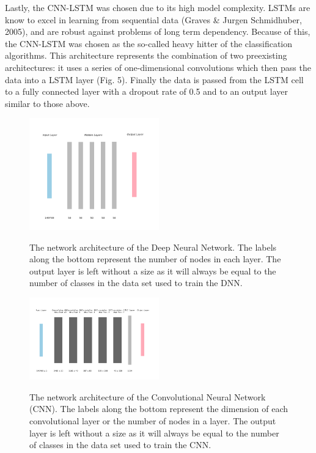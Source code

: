 \documentclass[letterpaper, 10 pt, conference]{ieeeconf}  %
\begin{document}
    Lastly, the CNN-LSTM was chosen due to its high model complexity. LSTMs are know to excel in learning from sequential data (Graves \& Jurgen Schmidhuber, 2005), and are robust against problems of long term dependency. Because of this, the CNN-LSTM was chosen as the so-called heavy hitter of the classification algorithms. This architecture represents the combination of two preexisting architectures: it uses a series of one-dimensional convolutions which then pass the data into a LSTM layer (Fig. 5). Finally the data is passed from the LSTM cell to a fully connected layer with a dropout rate of 0.5 and to an output layer similar to those above. 
 
\begin{figure}
	\centering
    {\label{ref_label1}\includegraphics[width=0.5\textwidth]{dnn.png}}
    \caption{\label{ref_label_overall}The network architecture of the Deep Neural Network. The labels along the bottom represent the number of nodes in each layer. The output layer is left without a size as it will always be equal to the number of classes in the data set used to train the DNN.}
\end{figure}
 
\begin{figure}
	\centering
	{\label{ref_label1}\includegraphics[width=0.5\textwidth]{cnn.png}}
    \caption{\label{ref_label_overall}The network architecture of the Convolutional Neural Network (CNN). The labels along the bottom represent the dimension of each convolutional layer or the number of nodes in a layer. The output layer is left without a size as it will always be equal to the number of classes in the data set used to train the CNN.}
\end{figure} 
\end{document}
